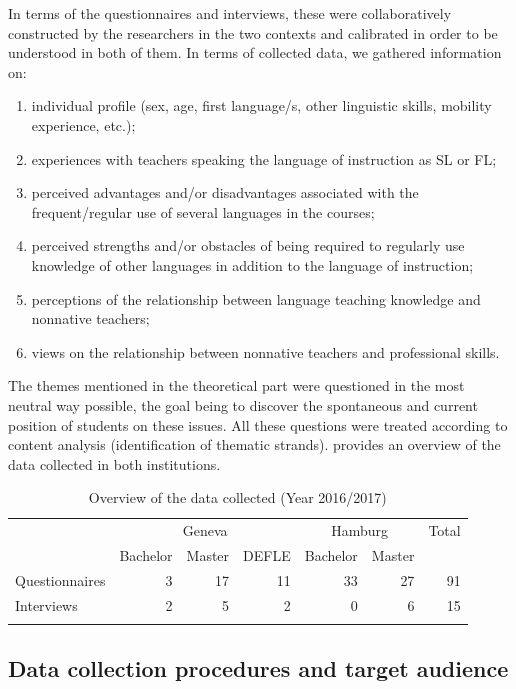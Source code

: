 \documentclass[output=paper]{../langscibook}
\begin{document}
In terms of the questionnaires and interviews, these were collaboratively constructed by the researchers in the two contexts and calibrated in order to be understood in both of them. In terms of collected data, we gathered information on: 

\begin{enumerate}[noitemsep]
\item individual profile (sex, age, first language/s, other linguistic skills, mobility experience, etc.); 
\item experiences with teachers speaking the language of instruction as SL or FL; 
\item perceived advantages and\slash or disadvantages associated with the frequent\slash regular use of several languages in the courses; 
\item perceived strengths and\slash or obstacles of being required to regularly use knowledge of other languages in addition to the language of instruction; 
\item perceptions of the relationship between language teaching knowledge and nonnative teachers; 
\item views on the relationship between nonnative teachers and professional skills. 
\end{enumerate}

\noindent The themes mentioned in the theoretical part were questioned in the most neutral way possible, the goal being to discover the spontaneous and current position of students on these issues. All these questions were treated according to content analysis (identification of thematic strands).  provides an overview of the data collected in both institutions.

\begin{table}
\begin{tabular}{l rrr rr r}
\lsptoprule
 & \multicolumn{3}{c}{Geneva} & \multicolumn{2}{c}{Hamburg} & Total\\\cmidrule(lr){2-4}\cmidrule(lr){5-6}
 & Bachelor & Master & DEFLE & Bachelor & Master & \\\midrule
Questionnaires & 3 & 17 & 11 & 33 & 27 & 91\\
Interviews     & 2 & 5 & 2 & 0 & 6 & 15\\
\lspbottomrule
\end{tabular}
\caption{Overview of the data collected (Year 2016/2017)\label{tab:9:1}}
\end{table}

\subsection{Data collection procedures and target audience}
\end{document}
